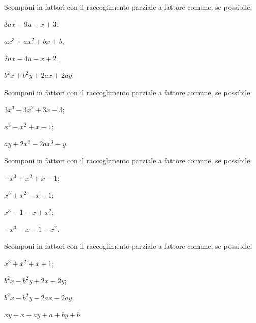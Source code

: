 \begin{esercizio}
\label{ese:15.18}
Scomponi in fattori con il raccoglimento parziale a fattore comune, se possibile.
\begin{multicols}{2}
\begin{enumeratea}
 \item $3ax-9a-x+3$;
 \item $ax^{3}+ax^{2}+bx+b$;
 \item $2ax-4a-x+2$;
 \item $b^{2}x+b^{2}y+2ax+2ay$.
\end{enumeratea}
\end{multicols}
\end{esercizio}

\begin{esercizio}[\Ast]
\label{ese:15.19}
Scomponi in fattori con il raccoglimento parziale a fattore comune, se possibile.
\begin{multicols}{3}
 \begin{enumeratea}
 \item $3x^{3}-3x^{2}+3x-3$;
 \item $x^{3}-x^{2}+x-1$;
 \item $ay+2x^{3}-2ax^{3}-y$.
\end{enumeratea}
\end{multicols}
\end{esercizio}

\begin{esercizio}
\label{ese:15.20}
Scomponi in fattori con il raccoglimento parziale a fattore comune, se possibile.
\begin{multicols}{2}
\begin{enumeratea}
 \item $-x^{3}+x^{2}+x-1$;
 \item $x^{3}+x^{2}-x-1$;
 \item $x^{3}-1-x+x^{2}$;
 \item $-x^{3}-x-1-x^{2}$.
\end{enumeratea}
\end{multicols}
\end{esercizio}

\begin{esercizio}
\label{ese:15.21}
Scomponi in fattori con il raccoglimento parziale a fattore comune, se possibile.
\begin{multicols}{2}
\begin{enumeratea}
 \item $x^{3}+x^{2}+x+1$;
 \item $b^{2}x-b^{2}y+2x-2y$;
 \item $b^{2}x-b^{2}y-2ax-2ay$;
 \item $xy+x+ay+a+by+b$.
\end{enumeratea}
\end{multicols}
\end{esercizio}

